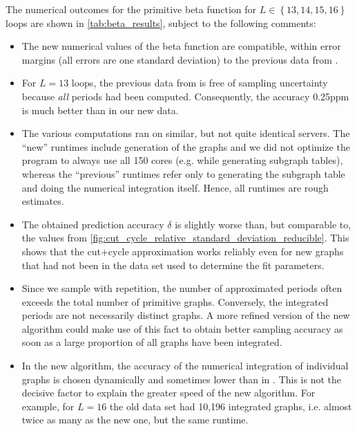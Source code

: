 \documentclass[12pt]{article}
\numberwithin{equation}{section}
\begin{document}
The numerical outcomes for the primitive beta function for $L\in \left \lbrace 13,14,15,16 \right \rbrace $ loops are shown in \cref{tab:beta_results}, subject to the following comments:
\begin{itemize}
	\item The new numerical values of the beta function are compatible, within error margins (all errors are one standard deviation) to the previous data from \cite{balduf_statistics_2023}.
	\item For $L=13$ loops, the previous data from \cite{balduf_statistics_2023} is free of sampling uncertainty because \emph{all} periods had been computed. Consequently, the accuracy 0.25ppm is much better than in our new data.
	\item The various computations ran on similar, but not quite identical  servers. The \enquote{new} runtimes include generation of the graphs and we did not optimize the program to always use all 150 cores (e.g. while generating subgraph tables), whereas the \enquote{previous} runtimes  refer only to generating the subgraph table and doing the numerical integration itself. Hence, all runtimes are rough estimates.
	\item The obtained prediction accuracy $\delta$ is slightly worse than, but comparable to, the values from \cref{fig:cut_cycle_relative_standard_deviation_reducible}. This shows that the cut+cycle approximation works reliably even for new graphs that had not been in the data set used to determine the fit parameters.
	\item Since we sample with repetition, the number of approximated periods often exceeds the total number of primitive graphs.   Conversely, the integrated periods are not necessarily distinct graphs. A more refined version of the new algorithm could make use of this fact to obtain better sampling accuracy  as soon as a large proportion of all graphs have been integrated.
	\item In the new algorithm, the accuracy of the numerical integration of individual graphs is chosen dynamically and sometimes lower than in \cite{balduf_statistics_2023}. This   is not the decisive factor to explain the greater speed of the new algorithm. For example, for $L=16$ the old data set had 10,196 integrated graphs, i.e. almost twice as many as the new one, but the same runtime. 
\end{itemize}
\end{document}
